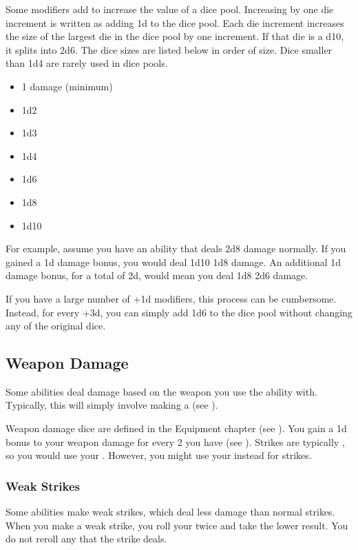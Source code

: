             Some modifiers add  to increase the value of a dice pool.
            Increasing by one die increment is written as adding \plus1d to the dice pool.
            Each die increment increases the size of the largest die in the dice pool by one increment.
            If that die is a d10, it splits into 2d6.
            The dice sizes are listed below in order of size.
            Dice smaller than 1d4 are rarely used in dice pools.
            \begin{itemize}
                \item 1 damage (minimum)
                \item 1d2
                \item 1d3
                \item 1d4
                \item 1d6
                \item 1d8
                \item 1d10
            \end{itemize}

            For example, assume you have an ability that deals 2d8 damage normally.
            If you gained a \plus1d damage bonus, you would deal 1d10 \add 1d8 damage.
            An additional \plus1d damage bonus, for a total of \plus2d, would mean you deal 1d8 \add 2d6 damage.

            If you have a large number of +1d modifiers, this process can be cumbersome.
            Instead, for every +3d, you can simply add 1d6 to the dice pool without changing any of the original dice.

    \subsection{Weapon Damage}\label{Weapon Damage}
        Some abilities deal damage based on the weapon you use the ability with.
        Typically, this will simply involve making a  (see ).

        Weapon damage dice are defined in the Equipment chapter (see ).
        You gain a \plus1d bonus to your weapon damage for every 2  you have (see ).
        Strikes are typically , so you would use your .
        However, you might use your  instead for \magical strikes.

        \subsubsection{Weak Strikes}
            Some abilities make weak strikes, which deal less damage than normal strikes.
            When you make a weak strike, you roll your  twice and take the lower result.
            You do not reroll any  that the strike deals.

